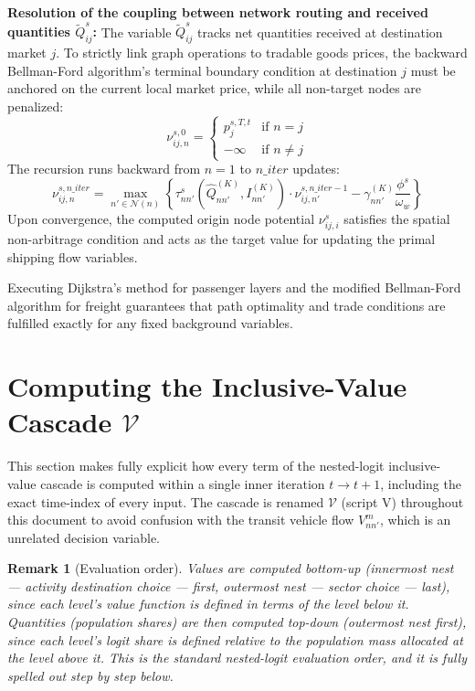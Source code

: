 \documentclass[11pt,a4paper]{article}
\newtheorem{remark}{Remark}
\newcommand{\IV}{\mathcal{V}}
\begin{document}
\textbf{Resolution of the coupling between network routing and received quantities $\tilde{Q}^s_{ij}$:} The variable $\tilde{Q}^s_{ij}$ tracks net quantities received at destination market $j$. To strictly link graph operations to tradable goods prices, the backward Bellman-Ford algorithm's terminal boundary condition at destination $j$ must be anchored on the current local market price, while all non-target nodes are penalized:
\begin{equation}
    \nu_{ij,n}^{s, 0} =
    \begin{cases}
        p_j^{s,T,t} & \text{if } n = j \\
        -\infty & \text{if } n \neq j
    \end{cases}
\end{equation}
The recursion runs backward from $n=1$ to $n\_iter$ updates:
\begin{equation}
    \nu_{ij,n}^{s, n\_iter} = \max_{n' \in \mathcal{N}(n)} \left\{ \tau^s_{nn'}(\hat Q_{nn'}^{(K)}, I_{nn'}^{(K)}) \cdot \nu_{ij,n'}^{s, n\_iter-1} - \gamma_{nn'}^{(K)} \frac{\phi^s}{\omega_w} \right\}
\end{equation}
Upon convergence, the computed origin node potential $\nu_{ij,i}^s$ satisfies the spatial non-arbitrage condition and acts as the target value for updating the primal shipping flow variables.

Executing Dijkstra's method for passenger layers and the modified Bellman-Ford algorithm for freight guarantees that path optimality and trade conditions are fulfilled exactly for any fixed background variables.

\section{Computing the Inclusive-Value Cascade $\IV$}
\label{sec:inclusive_value}

This section makes fully explicit how every term of the nested-logit inclusive-value cascade is computed within a single inner iteration $t \to t+1$, including the exact time-index of every input. The cascade is renamed $\IV$ (script V) throughout this document to avoid confusion with the transit vehicle flow $V^m_{nn'}$, which is an unrelated decision variable.

\begin{remark}[Evaluation order]
Values are computed \emph{bottom-up} (innermost nest — activity destination choice — first, outermost nest — sector choice — last), since each level's value function is defined in terms of the level below it. Quantities (population shares) are then computed \emph{top-down} (outermost nest first), since each level's logit share is defined relative to the population mass allocated at the level above it. This is the standard nested-logit evaluation order, and it is fully spelled out step by step below.
\end{remark}
\end{document}
